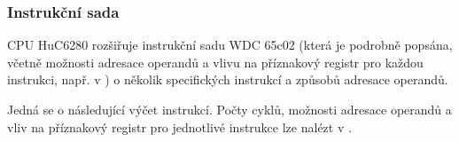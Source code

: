 \newpage


\subsubsection{Instrukční sada}\label{chap:spec_hw_cpu_instr}

CPU HuC6280 rozšiřuje instrukční sadu WDC 65c02 (která je podrobně popsána,
včetně možnosti adresace operandů a vlivu na příznakový registr pro každou
instrukci, např. v \cite{www65c02}) o několik specifických instrukcí a způsobů
adresace operandů.

Jedná se o následující výčet instrukcí. Počty cyklů, možnosti adresace operandů
a vliv na příznakový registr pro jednotlivé instrukce lze nalézt v
\cite{Ormston06}.

